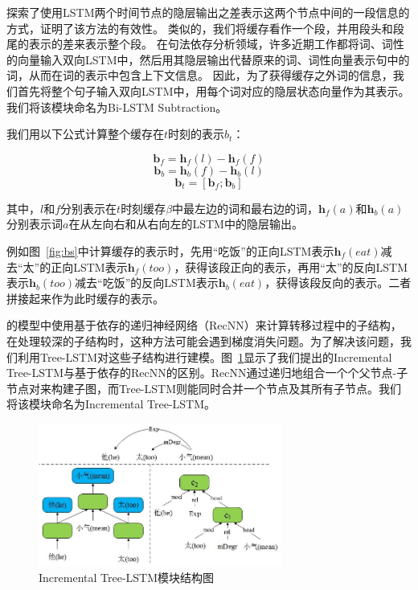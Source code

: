 探索了使用LSTM两个时间节点的隐层输出之差表示这两个节点中间的一段信息的方式，证明了该方法的有效性。
类似的，我们将缓存看作一个段，并用段头和段尾的表示的差来表示整个段。
在句法依存分析领域，许多近期工作都将词、词性的向量输入双向LSTM中，然后用其隐层输出代替原来的词、词性向量表示句中的词，从而在词的表示中包含上下文信息。
因此，为了获得缓存之外词的信息，我们首先将整个句子输入双向LSTM中，用每个词对应的隐层状态向量作为其表示。我们将该模块命名为Bi-LSTM Subtraction。

我们用以下公式计算整个缓存在$t$时刻的表示$b_t$：

\begin{equation}
\mathbf{b}_f=\mathbf{h}_f(l)-\mathbf{h}_f(f)
\end{equation}
\begin{equation}
\mathbf{b}_b=\mathbf{h}_b(f)-\mathbf{h}_b(l)
\end{equation}
\begin{equation}
\mathbf{b}_t=[\mathbf{b}_f ; \mathbf{b}_b]
\end{equation}

其中，$l$和$f$分别表示在$t$时刻缓存$\beta$中最左边的词和最右边的词，$\mathbf{h}_f(a)$和$\mathbf{h}_b(a)$分别表示词$a$在从左向右和从右向左的LSTM中的隐层输出。

例如图~\ref{fig:bs}中计算缓存的表示时，先用“吃饭”的正向LSTM表示$\mathbf{h}_f(eat)$减去“太”的正向LSTM表示$\mathbf{h}_f(too)$，获得该段正向的表示，再用“太”的反向LSTM表示$\mathbf{h}_b(too)$减去“吃饭”的反向LSTM表示$\mathbf{h}_b(eat)$，获得该段反向的表示。二者拼接起来作为此时缓存的表示。

的模型中使用基于依存的递归神经网络（RecNN）来计算转移过程中的子结构，在处理较深的子结构时，这种方法可能会遇到梯度消失问题。为了解决该问题，我们利用Tree-LSTM对这些子结构进行建模。图~\ref{fig:it}显示了我们提出的Incremental Tree-LSTM与基于依存的RecNN的区别。RecNN通过递归地组合一个个父节点-子节点对来构建子图，而Tree-LSTM则能同时合并一个节点及其所有子节点。我们将该模块命名为Incremental Tree-LSTM。

\begin{figure}[hbtp]
	\centering
	\includegraphics[width=80mm]{picture/it.jpg}
	\caption{Incremental Tree-LSTM模块结构图}
	\label{fig:it}
\end{figure}

